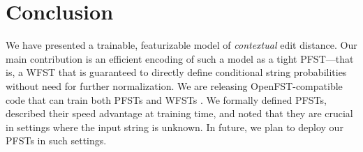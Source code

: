 \documentclass[11pt,letterpaper]{article}
\newcommand{\ryan}[1]{\todo[color=green!40,author=Ryan]{#1}}
\newcommand{\jason}[1]{\todo[color=blue!40,author=Jason]{#1}}
\newcommand{\SkipForSpace}[1]{}
\begin{document}
\section{Conclusion}

We have presented a trainable, featurizable model of {\em contextual} edit distance\SkipForSpace{and 
tested it in an example domain}. Our main contribution is an efficient encoding of such a model as a tight PFST---that is, a WFST that is guaranteed to directly define conditional string probabilities without need for further normalization.  We are releasing OpenFST-compatible code that can train both PFSTs and WFSTs \cite{cotterell2014brezel}.  We formally defined PFSTs, described their speed advantage at training time, and noted that they are crucial in settings where the input string is unknown.  In future, we plan to deploy our PFSTs in such settings. %
 
\end{document}
